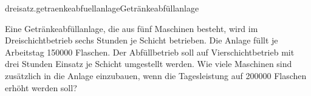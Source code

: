 \begin{exercise}{dreisatz.getraenkeabfuellanlage}{Getränkeabfüllanlage}
  \ifproblem\problem\par
    Eine Getränkeabfüllanlage, die aus fünf Maschinen besteht, wird im
    Dreischichtbetrieb sechs Stunden je Schicht betrieben. Die Anlage füllt
    je Arbeitstag \num{150000} Flaschen. Der Abfüllbetrieb soll auf Vierschichtbetrieb
    mit drei Stunden Einsatz je Schicht umgestellt werden. Wie viele Maschinen
    sind zusätzlich in die Anlage einzubauen, wenn die Tagesleistung auf \num{200000}
    Flaschen erhöht werden soll?
  \fi
\end{exercise}
